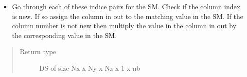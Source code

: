 \documentclass[letterpaper,10pt,english]{sphinxmanual}
\begin{document}
\begin{fulllineitems}
\begin{fulllineitems}
\begin{description}
\begin{itemize}
\item {} 
Go through each of these indice pairs for the SM.       Check if the column index is new. If so assign       the column in out to the matching       value in the SM. If the column number is not       new then multiply the value in the column in       out by the corresponding value in the SM.

\end{itemize}

\end{description}

\begin{sphinxVerbatim}[commandchars=\\\{\}]
\PYG{p}{[}
\PYG{p}{[}      \PYG{p}{[}\PYG{p}{]}
      \PYG{p}{[}\PYG{p}{]}
      \PYG{p}{[}\PYG{p}{]}
\PYG{p}{]}
\PYG{p}{[}      \PYG{p}{[}\PYG{p}{]}
      \PYG{p}{[}\PYG{p}{]}
      \PYG{p}{[}\PYG{p}{]}
\PYG{p}{]}
\PYG{p}{]}
\end{sphinxVerbatim}
\begin{quote}\begin{description}
\item[{Return type}] \leavevmode
DS of size Nx x Ny x Nz x 1 x nb


\end{description}
\end{quote}
\end{fulllineitems}
\end{fulllineitems}
\end{document}
